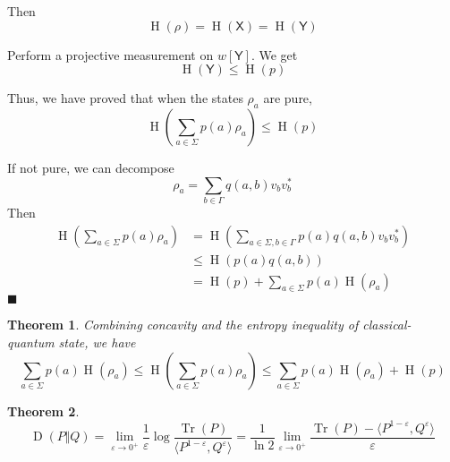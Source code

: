 \documentclass[aps,pra,onecolumn,notitlepage,superscriptaddress]{revtex4-1}
\newcommand{\reg}[1]{\mathsf{#1}}
\def\>{\rangle}
\def\<{\langle}
\newcommand{\Tr}{\operatorname{Tr}}
\newcommand{\op}[1]{\operatorname{#1}}
\newtheorem{theo}{Theorem}
\def\qed{$\blacksquare$ \newline}
\begin{document}
    Then
    \begin{equation}
        \op H(\rho) = \op H(\reg X) = \op H(\reg Y)
    \end{equation}

    Perform a projective measurement on $w[\reg Y]$. We get
    \begin{equation}
        \op H(\reg Y) \leq \op H(p)
    \end{equation}

    Thus, we have proved that when the states $\rho_a$ are pure,
    \begin{equation}
        \op H \left(\sum_{a \in \Sigma} p(a) \rho_a \right) \leq \op H(p)
    \end{equation}

    If not pure, we can decompose
    \begin{equation}
        \rho_a = \sum_{b \in \Gamma} q(a,b) v_bv_b^*
    \end{equation}
    Then
    \begin{align*}
        \op H \left(\sum_{a \in \Sigma} p(a) \rho_a \right)
        &= \op H \left(\sum_{a \in \Sigma, b \in \Gamma} p(a) q(a,b) v_bv_b^* \right) \\
        &\leq \op H(p(a)q(a,b)) \\
        &= \op H(p) + \sum_{a \in \Sigma} p(a) \op H(\rho_a)
    \end{align*}
    \qed

    \begin{theo}
        Combining concavity and the entropy inequality of classical-quantum state, we have
        \begin{equation}
            \sum_{a \in \Sigma} p(a) \op H(\rho_a) \leq \op H \left(\sum_{a \in \Sigma} p(a) \rho_a \right) \leq \sum_{a \in \Sigma} p(a) \op H(\rho_a) + \op H(p)
        \end{equation}
    \end{theo}

    \begin{theo}
        \begin{equation}
            \op D(P \Vert Q) = \lim_{\varepsilon \to 0^+} \frac 1 \varepsilon \log \frac{\Tr(P)}{\< P^{1-\varepsilon}, Q^\varepsilon \>} = \frac{1}{\ln 2} \lim_{\varepsilon \to 0^+}\frac{\Tr (P) - \< P^{1-\varepsilon}, Q^\varepsilon\>}{\varepsilon}
        \end{equation}
    \end{theo}
\end{document}
